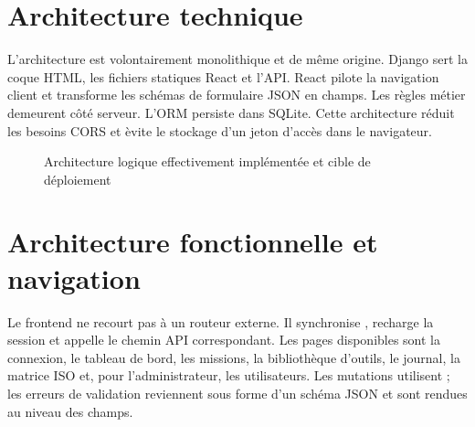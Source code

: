 \section*{Architecture technique}
L'architecture est volontairement monolithique et de m\^eme origine. Django sert la coque HTML, les fichiers statiques React et l'API. React pilote la navigation client et transforme les sch\'emas de formulaire JSON en champs. Les r\`egles m\'etier demeurent c\^ot\'e serveur. L'ORM persiste dans SQLite. Cette architecture r\'eduit les besoins CORS et \`evite le stockage d'un jeton d'acc\`es dans le navigateur.

\begin{figure}[H]
\centering
{}
\caption{Architecture logique effectivement impl\'ement\'ee et cible de d\'eploiement}
\label{fig:architecture}
\end{figure}

\section*{Architecture fonctionnelle et navigation}
Le frontend ne recourt pas \`a un routeur externe. Il synchronise , recharge la session et appelle le chemin API correspondant. Les pages disponibles sont la connexion, le tableau de bord, les missions, la biblioth\`eque d'outils, le journal, la matrice ISO et, pour l'administrateur, les utilisateurs. Les mutations utilisent ; les erreurs de validation reviennent sous forme d'un sch\'ema JSON et sont rendues au niveau des champs.

